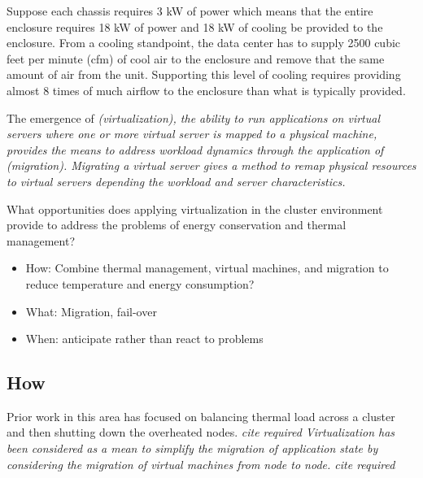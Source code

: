 \documentclass[times, 10pt,onecolumn]{article}
\begin{document}
Suppose each chassis requires 3 kW of power which means that the entire
enclosure requires 18 kW of power and 18 kW of cooling be provided to the
enclosure. From a cooling standpoint, the data center has to supply 2500 cubic
feet per minute (cfm) of cool air to the enclosure and remove that the same
amount of air from the unit.  Supporting this level of cooling requires
providing almost 8 times of much airflow to the enclosure than what is
typically provided.

The emergence of \it(virtualization), the ability to run applications on
virtual servers where one or more virtual server is mapped to a physical
machine, provides the means to address workload dynamics through the
application of \it(migration).   Migrating a virtual server gives a method to
remap physical resources to virtual servers depending the workload and server characteristics.

What opportunities does applying virtualization in the cluster environment
provide to address the problems of energy conservation and thermal management?

\begin{itemize}
\item How: Combine thermal management, virtual machines, and migration to
  reduce temperature and energy consumption?
\item What: Migration, fail-over
\item When: anticipate rather than react to problems
\end{itemize}

\subsection{How}
\label{sec:how}
Prior work in this area has focused on balancing thermal load across a cluster
and then shutting down the overheated nodes. \it{cite required}
Virtualization has been considered as a mean to simplify the migration of
application state by considering the migration of virtual machines from node
to node. \it{cite required}
\end{document}
